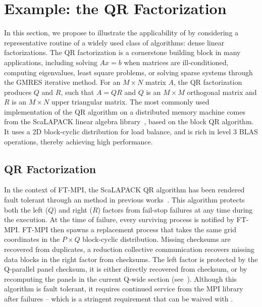 \section{Example: the QR Factorization}
\label{sec:ftla}

In this section, we propose to illustrate the applicability of \cof by
considering a representative routine of a widely used
class of algorithms: dense linear factorizations. The QR factorization
is a cornerstone building block in many applications, including solving
$Ax=b$ when matrices are ill-conditioned, computing eigenvalues, least
square problems, or solving sparse systems through the GMRES iterative
method. For an $M\times N$ matrix $A$, the QR factorization produces $Q$ and
$R$, such that $A=QR$ and $Q$ is an $M\times M$ orthogonal matrix and
$R$ is an $M\times N$ upper triangular matrix. The most commonly used
implementation of the QR algorithm on a distributed memory machine comes
from the ScaLAPACK linear algebra library~\cite{dongarra1997scalapack},
based on the block QR algorithm. It uses a 2D block-cyclic distribution
for load balance, and is rich in level 3 BLAS operations, thereby
achieving high performance.


\subsection{\abft QR Factorization}

In the context of FT-MPI, the ScaLAPACK QR algorithm has been rendered fault
tolerant through an \abft method in previous works~\cite{pengduppopp12}. This
\abft algorithm protects both the left ($Q$) and right ($R$) factors from fail-stop
failures at any time during the execution.  At the time of failure, every surviving process is notified by FT-MPI. FT-MPI
then spawns a replacement process that takes the same grid coordinates in the
$P\times Q$ block-cyclic distribution. Missing checksums are recovered from
duplicates, a reduction collective communication recovers missing data blocks in
the right factor from checksums. The left factor is protected by the Q-parallel
panel checksum, it is either directly recovered from checksum, or by
recomputing the panels in the current Q-wide section
(see~\cite{pengduppopp12}). Although this algorithm is fault tolerant, it
requires continued service from the MPI library after failures -- which is a
stringent requirement that can be waived with \cof.

